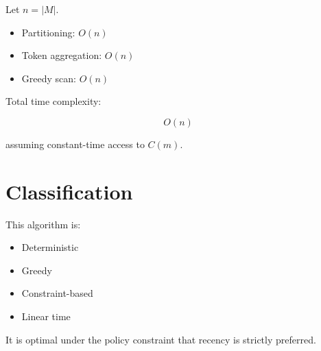Let $n = |M|$.

\begin{itemize}
  \item Partitioning: $O(n)$
  \item Token aggregation: $O(n)$
  \item Greedy scan: $O(n)$
\end{itemize}

Total time complexity:

\[ O(n) \]

assuming constant-time access to $C(m)$.

\section{Classification}

This algorithm is:

\begin{itemize}
  \item Deterministic
  \item Greedy
  \item Constraint-based
  \item Linear time
\end{itemize}

It is optimal under the policy constraint that recency is strictly preferred.